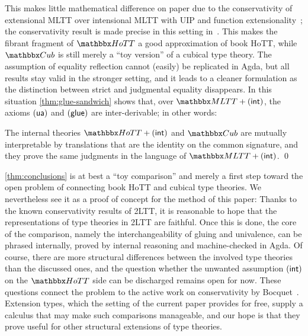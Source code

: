 This makes little mathematical difference on paper due to the conservativity of extensional MLTT over intensional MLTT with UIP and function extensionality~\cite{Hofmann1995, Oury2005,Winterhalter2020}; the conservativity result is made precise in this setting in~\cite[Prop.~2.19]{2LTT}.
This makes the fibrant fragment of $\bbHoTT$ a good approximation of book HoTT, while $\bbCub$ is still merely a ``toy version'' of a cubical type theory.
The assumption of equality reflection cannot (easily) be replicated in Agda, but all results stay valid in the stronger setting, and it leads to a cleaner formulation as the distinction between strict and judgmental equality disappears.
In this situation \cref{thm:glue-sandwich} shows that, over $\bbMLTT + \axInt$, the axioms $\mathsf{(ua)}$ and $\mathsf{(glue)}$ are inter-derivable; in other words:

\begin{theorem}\label{thm:conclusions}
	The internal theories $\bbHoTT + \axInt$ and $\bbCub$ are mutually interpretable by translations that are the identity on the common signature, and they prove the same judgments in the language of $\bbMLTT + \axInt$.
	\qed
\end{theorem}

\cref{thm:conclusions} is at best a ``toy comparison''
and merely a first step toward the open problem of connecting book HoTT
and cubical type theories. We nevertheless see it as a proof of concept
for the method of this paper: 
Thanks to the known conservativity results of 2LTT, it is reasonable to hope that the representations of type theories in 2LTT are faithful. Once this is done, the core of the comparison, namely the
interchangeability of gluing and univalence, can be phrased internally, proved by internal reasoning and machine-checked in Agda.
Of course, there are more structural differences between the involved type theories than the discussed ones, and the question whether the unwanted assumption $\mathsf{(int)}$ on the $\bbHoTT$ side can be discharged remains open for now.
These questions connect the problem to the active work on conservativity by Bocquet~\citep{rafael_framework}.
Extension types, which the setting of the current paper provides for free, supply a calculus that may make such comparisons manageable, and our hope is that they prove useful for other structural extensions of type theories.



